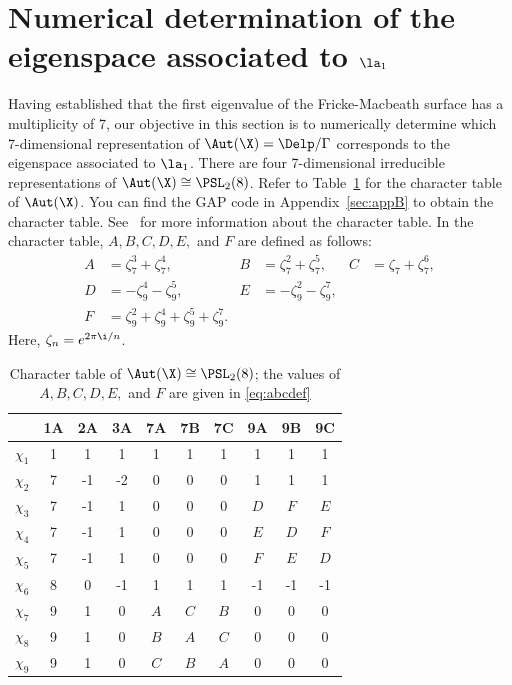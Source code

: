 \section{Numerical determination of the eigenspace associated to $\la_1$}
Having established that the first eigenvalue of the Fricke-Macbeath surface has a multiplicity of 7, our objective in this section is to numerically determine which 7-dimensional representation of $\Aut(\X)=\Delp/\Gamma$ corresponds to the eigenspace associated to $\la_1$.
There are four 7-dimensional irreducible representations of $\Aut(\X)\cong \PSL_2(8)$.
Refer to Table~\ref{table:character_table} for the character table of $\Aut(\X)$.
You can find the GAP code in Appendix~\ref{sec:appB} to obtain the character table.
See~\cite[p. 6]{MR0827219} for more information about the character table.
In the character table, \( A, B, C, D, E, \) and \( F \) are defined as follows:
\begin{equation} \label{eq:abcdef}
\begin{aligned}
A &= \zeta_7^3 + \zeta_7^4, & B &= \zeta_7^2 + \zeta_7^5, & C &= \zeta_7 + \zeta_7^6, \\
D &= -\zeta_9^4 - \zeta_9^5, & E &= -\zeta_9^2 - \zeta_9^7, \\
F &= \zeta_9^2 + \zeta_9^4 + \zeta_9^5 + \zeta_9^7.
\end{aligned}
\end{equation}
Here, $\zeta_n = e^{2\pi \i /n}$.

\begin{table}[h]
    \centering
    \begin{tabular}{l|ccccccccc}
          & \textbf{1A} & \textbf{2A} & \textbf{3A} & \textbf{7A} & \textbf{7B} & \textbf{7C} & \textbf{9A} & \textbf{9B} & \textbf{9C} \\
         \hline
        \(\chi_1\) & 1 & 1 & 1 & 1 & 1 & 1 & 1 & 1 & 1 \\
        \(\chi_2\) & 7 & -1 & -2 & 0 & 0 & 0 & 1 & 1 & 1 \\
        \(\chi_3\) & 7 & -1 & 1 & 0 & 0 & 0 & \(D\) & \(F\) & \(E\) \\
        \(\chi_4\) & 7 & -1 & 1 & 0 & 0 & 0 & \(E\) & \(D\) & \(F\) \\
        \(\chi_5\) & 7 & -1 & 1 & 0 & 0 & 0 & \(F\) & \(E\) & \(D\) \\
        \(\chi_6\) & 8 & 0 & -1 & 1 & 1 & 1 & -1 & -1 & -1 \\
        \(\chi_7\) & 9 & 1 & 0 & \(A\) & \(C\) & \(B\) & 0 & 0 & 0 \\
        \(\chi_8\) & 9 & 1 & 0 & \(B\) & \(A\) & \(C\) & 0 & 0 & 0 \\
        \(\chi_9\) & 9 & 1 & 0 & \(C\) & \(B\) & \(A\) & 0 & 0 & 0
    \end{tabular}
    \caption{Character table of \(\Aut(\X) \cong \PSL_2(8)\); the values of \( A, B, C, D, E, \) and \( F \) are given in \eqref{eq:abcdef}}
    \label{table:character_table}
\end{table}

